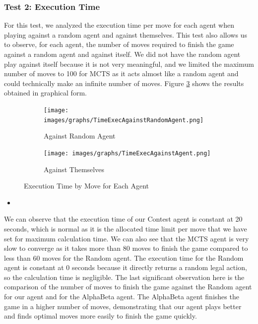 \documentclass[11pt,a4paper]{report}
\begin{document}
\begin{answers}[23cm]

\subsubsection{Test 2: Execution Time}
For this test, we analyzed the execution time per move for each agent when playing against a random agent and against themselves. This test also allows us to observe, for each agent, the number of moves required to finish the game against a random agent and against itself. We did not have the random agent play against itself because it is not very meaningful, and we limited the maximum number of moves to 100 for MCTS as it acts almost like a random agent and could technically make an infinite number of moves. Figure \ref{fig:LineChart_ExecTime} shows the results obtained in graphical form.

\begin{figure}[H]
    \centering
    \hspace{0cm}
    \begin{subfigure}[b]{0.50\textwidth}
    \centering
    \texttt{[image: images/graphs/TimeExecAgainstRandomAgent.png]}
    \caption{Against Random Agent}
    \label{fig:ExecTime_Random}
    \end{subfigure}
    \hspace{0cm}
    \begin{subfigure}[b]{0.45\textwidth}
    \centering
    \texttt{[image: images/graphs/TimeExecAgainstAgent.png]}
    \caption{Against Themselves}
    \label{fig:ExecTime_Agent}
    \end{subfigure}
    \caption{Execution Time by Move for Each Agent}
    \label{fig:LineChart_ExecTime}
\end{figure}

\begin{itemize}
    \item \textbf{}
\end{itemize}
We can observe that the execution time of our Contest agent is constant at 20 seconds, which is normal as it is the allocated time limit per move that we have set for maximum calculation time. We can also see that the MCTS agent is very slow to converge as it takes more than 80 moves to finish the game compared to less than 60 moves for the Random agent. The execution time for the Random agent is constant at 0 seconds because it directly returns a random legal action, so the calculation time is negligible. The last significant observation here is the comparison of the number of moves to finish the game against the Random agent for our agent and for the AlphaBeta agent. The AlphaBeta agent finishes the game in a higher number of moves, demonstrating that our agent plays better and finds optimal moves more easily to finish the game quickly.


\end{answers}
\end{document}
